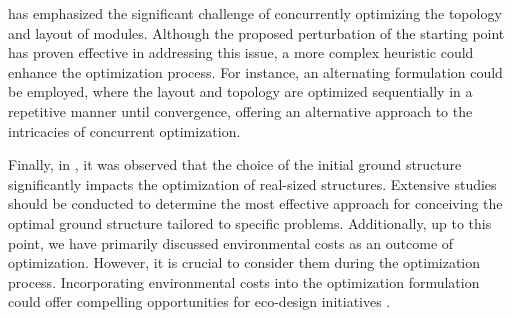  has emphasized the significant challenge of concurrently optimizing the topology and layout of modules. Although the proposed perturbation of the starting point has proven effective in addressing this issue, a more complex heuristic could enhance the optimization process. For instance, an alternating formulation could be employed, where the layout and topology are optimized sequentially in a repetitive manner until convergence, offering an alternative approach to the intricacies of concurrent optimization.

Finally, in , it was observed that the choice of the initial ground structure significantly impacts the optimization of real-sized structures. Extensive studies should be conducted to determine the most effective approach for conceiving the optimal ground structure tailored to specific problems. Additionally, up to this point, we have primarily discussed environmental costs as an outcome of optimization. However, it is crucial to consider them during the optimization process. Incorporating environmental costs into the optimization formulation could offer compelling opportunities for eco-design initiatives .